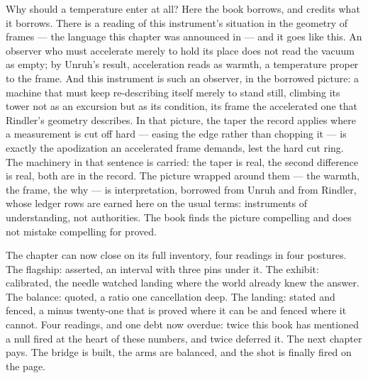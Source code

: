 Why should a temperature enter at all? Here the book borrows, and credits what it
borrows. There is a reading of this instrument's situation in the geometry of
frames --- the language this chapter was announced in --- and it goes like this. An
observer who must accelerate merely to hold its place does not read the vacuum as
empty; by Unruh's result, acceleration reads as warmth, a temperature proper to the
frame. And this instrument is such an observer, in the borrowed picture: a machine
that must keep re-describing itself merely to stand still, climbing its tower not
as an excursion but as its condition, its frame the accelerated one that Rindler's
geometry describes. In that picture, the taper the record applies where a
measurement is cut off hard --- easing the edge rather than chopping it --- is
exactly the apodization an accelerated frame demands, lest the hard cut ring. The
machinery in that sentence is carried: the taper is real, the second difference is
real, both are in the record. The picture wrapped around them --- the warmth, the
frame, the why --- is interpretation, borrowed from Unruh and from Rindler, whose
ledger rows are earned here on the usual terms: instruments of understanding, not
authorities. The book finds the picture compelling and does not mistake compelling
for proved.

The chapter can now close on its full inventory, four readings in four postures.
The flagship: asserted, an interval with three pins under it. The exhibit:
calibrated, the needle watched landing where the world already knew the answer.
The balance: quoted, a ratio one cancellation deep. The landing: stated and
fenced, a minus twenty-one that is proved where it can be and fenced where it
cannot. Four readings, and one debt now overdue: twice this book has mentioned a
null fired at the heart of these numbers, and twice deferred it. The next chapter
pays. The bridge is built, the arms are balanced, and the shot is finally fired
on the page.
